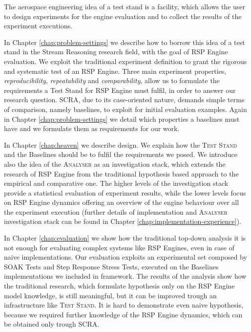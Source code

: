 The aerospace engineering idea of a test stand is a facility, which allows the user to design experiments for the engine evaluation and to collect the results of the experiment executions. 

In Chapter \ref{chap:problem-settings} we describe how to borrow this idea of a test stand in the Stream Reasoning research field, with the goal of RSP Engine evaluation. We exploit the traditional experiment definition to grant the rigorous and systematic test of an RSP Engine. Three main experiment properties, \textit{reproducibility}, \textit{repeatability} and \textit{comparability}, allow us to formulate the requirements a Test Stand for RSP Engine must fulfil, in order to answer our research question. SCRA, due to its case-oriented nature, demands simple terms of comparison, namely baselines, to exploit for initial evaluation examples.  Again in Chapter \ref{chap:problem-settings} we detail which properties a baselines must have and we formulate them as  requirements for our work.

In Chapter \ref{chap:heaven} we describe \name design. We explain how the \textsc{Test Stand} and the Baselines should be to fulfil the requirements we posed. We introduce also the idea of the \textsc{Analyser} as an investigation stack, which extends the research of RSP Engine from the traditional hypothesis based approach to the empirical and comparative one. The higher levels of the investigation stack provide a statistical evaluation of experiment results, while the lower levels focus on RSP Engine dynamics offering an overview of the engine behaviour over all the experiment execution (further details of \name implementation and \textsc{Analyser} investigation stack can be found in Chapter \ref{chap:implementation-experience}).

In Chapter \ref{chap:evaluation} we show how the traditional top-down analysis it is not enough for evaluating complex systems like RSP Engines, even in case of naive implementations. Our evaluation exploits an experimental set composed by SOAK Tests and Step Response Stress Tests, executed on the Baselines implementations we included in \name framework. The results of the analysis show how the traditional research, which formulate hypothesis only on the RSP Engine model knowledge, is still meaningful, but it can be improved trough an infrastructure like \name \textsc{Test Stand}. It is hard to demonstrate even naive hypothesis, because we required further knowledge of the RSP Engine dynamics, which can be obtained only trough SCRA.\\

